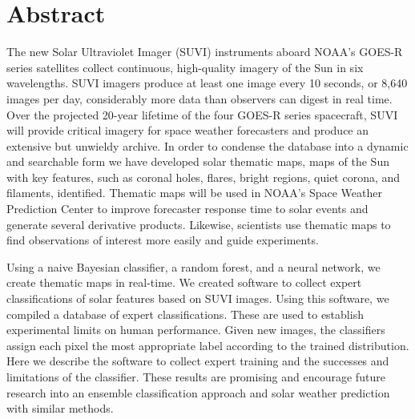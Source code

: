 \documentclass[twoside]{report}
\begin{document}
\tableofcontents
\listoffigures
\listoftables
\onehalfspacing
\chapter*{Abstract}
The new Solar Ultraviolet Imager (SUVI) instruments aboard NOAA’s GOES-R series satellites collect continuous, high-quality imagery of the Sun in six wavelengths. SUVI imagers produce at least one image every 10 seconds, or 8,640 images per day, considerably more data than observers can digest in real time. Over the projected 20-year lifetime of the four GOES-R series spacecraft, SUVI will provide critical imagery for space weather forecasters and produce an extensive but unwieldy archive. In order to condense the database into a dynamic and searchable form we have developed solar thematic maps, maps of the Sun with key features, such as coronal holes, flares, bright regions, quiet corona, and filaments, identified. Thematic maps will be used in NOAA’s Space Weather Prediction Center to improve forecaster response time to solar events and generate several derivative products. Likewise, scientists use thematic maps to find observations of interest more easily and guide experiments. 

Using a naive Bayesian classifier, a random forest, and a neural network, we create thematic maps in real-time. We created software to collect expert classifications of solar features based on SUVI images. Using this software, we compiled a database of expert classifications. These are used to establish experimental limits on human performance. Given new images, the classifiers assign each pixel the most appropriate label according to the trained distribution. Here we describe the software to collect expert training and the successes and limitations of the classifier. These results are promising and encourage future research into an ensemble classification approach and solar weather prediction with similar methods.
\end{document}
